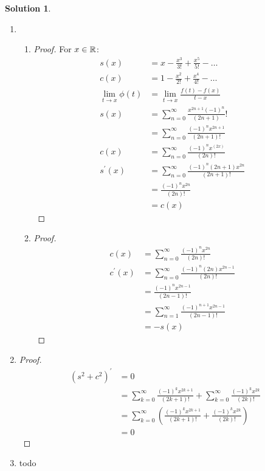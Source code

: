 \documentclass[12pt]{article}
\theoremstyle{definition} %
\newtheorem{solution}{Solution}
\theoremstyle{plain} %
\begin{document}
\begin{solution}
    \begin{enumerate}
        \item  \begin{enumerate}
            \item  \begin{proof}
        For $x\in\mathbb{\MakeUppercase{r}}$: 
   \begin{align}
    s(x) &= x-\frac{x^{3}}{3!}+\frac{x^{5}}{5!}-\ldots \\[10pt] 
    c(x) &= 1-\frac{x^{2}}{2!}+\frac{x^{4}}{4!}-\ldots \\[10pt] 
    \lim_{t \to x} \phi(t)&=\lim_{t \to x} \frac{f(t)-f(x)}{t-x}\\[10pt] 
    s(x)&=\sum_{n=0}^{\infty} \frac{x^{2n+1}(-1)^{n}}{(2n+1)}! \\[10pt] 
    &=\sum_{n=0}^{\infty} \frac{(-1)^{n}x^{2n+1}}{\left( 2n+1 \right)! } \\[10pt] 
    c(x) &= \sum_{n=0}^{\infty} \frac{(-1)^{n}x^{(2x)}}{\left( 2n \right)! }\\[10pt] 
    s^\prime (x)&=\sum_{n=0}^{\infty} \frac{(-1)^{n}(2n+1)x^{2n}}{\left( 2n+1 \right) !} \\[10pt] 
    &= \frac{(-1)^{n}x^{2n}}{\left( 2n \right) !} \\[10pt] 
    &= c(x)
   \end{align} 
    \end{proof}
    \item \begin{proof}
        \begin{align}
            c(x)&=\sum_{n=0}^{\infty} \frac{(-1)^{n}x^{2n}}{\left( 2n \right) !}\\[10pt] 
            c^\prime (x)&=\sum_{n=0}^{\infty} \frac{(-1)^{n}(2n)x^{2n-1}}{(2n)!}\\[10pt] 
            &= \frac{(-1)^{n}x^{2n-1}}{(2n-1)!}\\[10pt] 
            &= \sum_{n=1}^{\infty} \frac{(-1)^{n+1}x^{2n-1}}{(2n-1)!}\\[10pt] 
            &= -s(x)
        \end{align}
    \end{proof}
        \end{enumerate}    
        \item \begin{proof}
            \begin{align}
            \left( s^{2}+c^{2} \right)^\prime &=0 \\[10pt] 
            &= \sum_{k=0}^{\infty} \frac{(-1)^{k}x^{2k+1}}{(2k+1)!} + \sum_{k=0}^{\infty} \frac{(-1)^{k}x^{2k}}{(2k)!}\\[10pt] 
            &= \sum_{k=0}^{\infty} \left( \frac{(-1)^{k}x^{2k+1}}{(2k+1)!} + \frac{(-1)^{k}x^{2k}}{(2k)!} \right) \\[10pt] 
            &= 0
        \end{align}
        \end{proof}    
        \item todo
    \end{enumerate}
   \end{solution}
\end{document}
